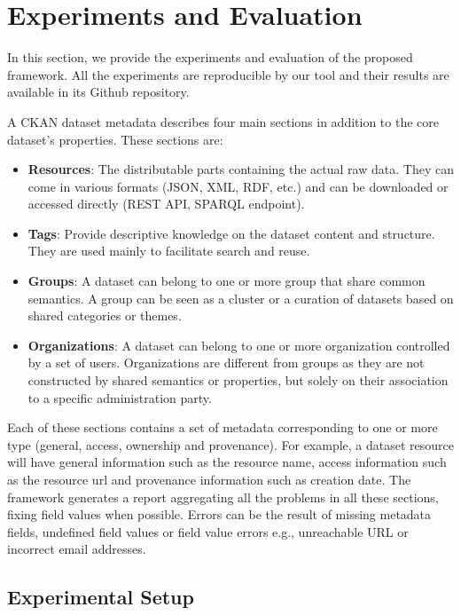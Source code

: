 \documentclass[runningheads,a4paper]{llncs}
\begin{document}

\section{Experiments and Evaluation}
\label{sec:experiment}

In this section, we provide the experiments and evaluation of the proposed framework. All the experiments are reproducible by our tool and their results are available in its Github repository.

A CKAN dataset metadata describes four main sections in addition to the core dataset's properties. These sections are:

\begin{itemize}
  \item \textbf{Resources}: The distributable parts containing the actual raw data. They can come in various formats (JSON, XML, RDF, etc.) and can be downloaded or accessed directly (REST API, SPARQL endpoint).
  \item \textbf{Tags}: Provide descriptive knowledge on the dataset content and structure. They are used mainly to facilitate search and reuse.
  \item \textbf{Groups}: A dataset can belong to one or more group that share common semantics. A group can be seen as a cluster or a curation of datasets based on shared categories or themes.
  \item \textbf{Organizations}: A dataset can belong to one or more organization controlled by a set of users. Organizations are different from groups as they are not constructed by shared semantics or properties, but solely on their association to a specific administration party.
\end{itemize}

Each of these sections contains a set of metadata corresponding to one or more type (general, access, ownership and provenance). For example, a dataset resource will have general information such as the resource name, access information such as the resource url and provenance information such as creation date. The framework generates a report aggregating all the problems in all these sections, fixing field values when possible. Errors can be the result of missing metadata fields, undefined field values or field value errors e.g., unreachable URL or incorrect email addresses.

\subsection{Experimental Setup}
\end{document}
